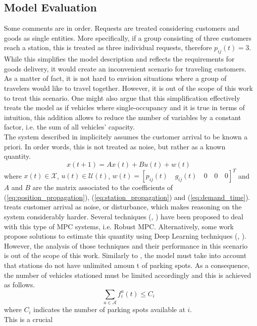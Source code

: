 \subsection{Model Evaluation}
Some comments are in order. Requests are treated considering customers and goods as single entities. More specifically, if a group consisting of three customers reach a station, this is treated as three individual requests, therefore $p_{ij}(t) = 3$. While this simplifies the model description and reflects the requirements for goods delivery, it would create an inconvenient scenario for traveling customers. As a matter of fact, it is not hard to envision situations where a group of travelers would like to travel together. However, it is out of the scope of this work to treat this scenario. One might also argue that this simplification effectively treats the model as if vehicles where single-occupancy and it is true in terms of intuition, this addition allows to reduce the number of variables by a constant factor, i.e. the sum of all vehicles' capacity. \\
The system described in  implicitely assumes the customer arrival to be known a priori. In order words, this is not treated as noise, but rather as a known quantity. 
\begin{equation}
	x(t+1) = Ax(t) + Bu(t) + w(t)\label{eq:disturbed_mpc_formulation}
\end{equation}
where $x(t) \in \mathcal{X}$, $u(t) \in \mathcal{U}(t)$, $w(t) = [p_{ij}(t)\quad g_{ij}(t)\quad0\quad0 \quad0]^T$ and $A$ and $B$ are the matrix associated to the coefficients of (\ref{eq:position_propagation}), (\ref{eq:station_propagation}) and (\ref{eq:demand_time}). \\
 treats customer arrival as noise, or disturbance, which makes reasoning on the system considerably harder. Several techniques (\cite{Campo1987RobustMP}, \cite{LANGSON2004125}) have been proposed to deal with this type of MPC systems, i.e. Robust MPC.  Alternatively, some work propose solutions to estimate this quantity using Deep Learning techniques (\cite{9202791}, \cite{8569427}).
However, the analysis of those techniques and their performance in this scenario is out of the scope of this work.
Similarly to , the model must take into account that stations do not have unlimited amoun t of parking spots. As a consequence, the number of vehicles stationed must be limited accordingly and this is achieved as follows. 
\begin{equation}
	\sum_{a \in \mathcal{A}}f^a_i(t) \leq C_i
	\label{eq:parking_limit}
\end{equation}
where $C_i$ indicates the number of parking spots available at $i$. \\
This is a crucial 

